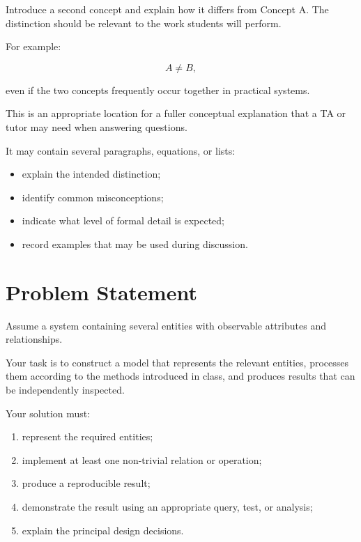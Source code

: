 \documentclass[11pt]{article}
\begin{document}
Introduce a second concept and explain how it differs from Concept A.
The distinction should be relevant to the work students will perform.

For example:

\[
A \neq B,
\]

even if the two concepts frequently occur together in practical systems.

\begin{tutornote}
This is an appropriate location for a fuller conceptual explanation that a
TA or tutor may need when answering questions.

It may contain several paragraphs, equations, or lists:

\begin{itemize}
    \item explain the intended distinction;
    \item identify common misconceptions;
    \item indicate what level of formal detail is expected;
    \item record examples that may be used during discussion.
\end{itemize}
\end{tutornote}

\section{Problem Statement}

Assume a system containing several entities with observable attributes and
relationships.

Your task is to construct a model that represents the relevant entities,
processes them according to the methods introduced in class, and produces
results that can be independently inspected.

Your solution must:

\begin{enumerate}
    \item represent the required entities;
    \item implement at least one non-trivial relation or operation;
    \item produce a reproducible result;
    \item demonstrate the result using an appropriate query, test, or analysis;
    \item explain the principal design decisions.
\end{enumerate}
\end{document}

